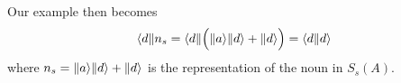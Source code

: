 \documentclass[12pt]{report}
\begin{document}
Our example then becomes
$$\langle d\|n_s = \langle d\| \Big(\|a \rangle\|d \rangle + \|d \rangle\Big) = \langle d\| d\rangle$$
where $n_s = \|a \rangle\|d \rangle + \|d \rangle$ is the representation of the noun in $S_s(A)$.









\end{document}

